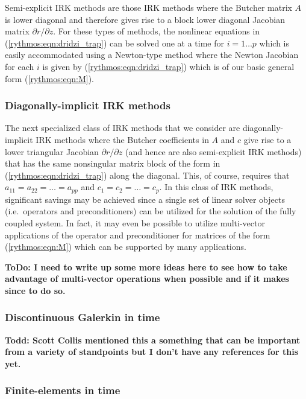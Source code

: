 \documentclass[pdf,ps2pdf,11pt]{SANDreport}
\begin{document}
Semi-explicit IRK methods are those IRK methods where the Butcher matrix $A$
is lower diagonal and therefore gives rise to a block lower diagonal Jacobian
matrix ${}\partial r / {}\partial z$.  For these types of methods, the
nonlinear equations in (\ref{rythmos:eqn:dridzi_trap}) can be solved one at a
time for $i = 1 {}\ldots p$ which is easily accommodated using a Newton-type
method where the Newton Jacobian for each $i$ is given by
(\ref{rythmos:eqn:dridzi_trap}) which is of our basic general form
(\ref{rythmos:eqn:M}).

\subsubsection*{Diagonally-implicit IRK methods}

The next specialized class of IRK methods that we consider are
diagonally-implicit IRK methods where the Butcher coefficients in $A$ and $c$
give rise to a lower triangular Jacobian ${}\partial r / {}\partial z$ (and
hence are also semi-explicit IRK methods) that has the same nonsingular matrix
block of the form in (\ref{rythmos:eqn:dridzi_trap}) along the diagonal.
This, of course, requires that $a_{11} = a_{22} = {}\ldots = a_{pp}$ and
$c_{1} = c_{2} = {}\ldots = c_{p}$.  In this class of IRK methods, significant
savings may be achieved since a single set of linear solver objects (i.e.\
operators and preconditioners) can be utilized for the solution of the fully
coupled system.  In fact, it may even be possible to utilize multi-vector
applications of the operator and preconditioner for matrices of the form
(\ref{rythmos:eqn:M}) which can be supported by many applications.

{}\textbf{ToDo: I need to write up some more ideas here to see how to take
advantage of multi-vector operations when possible and if it makes since to do
so.}

\subsubsection{Discontinuous Galerkin in time}

\cite{DGTime}
{}\textbf{Todd: Scott Collis mentioned this a something that can be important
from a variety of standpoints but I don't have any references for this yet.}

\subsubsection{Finite-elements in time }
\end{document}
